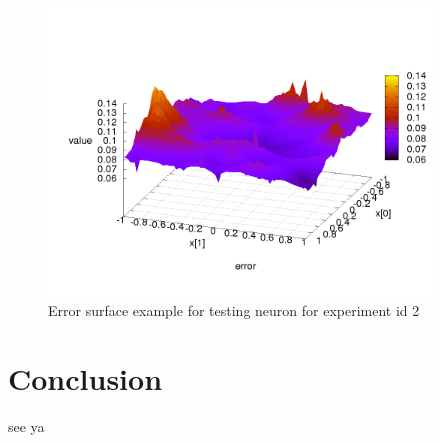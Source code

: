 \documentclass[times]{cpeauth}
\begin{document}
\begin{figure}[!ht]
\centering
\includegraphics[width=4.0in]{images/testing_neuron_1_layer_result_log_output_error.png}
\caption{Error surface example for testing neuron for experiment id 2}
\label{img:NN error example 01}
\end{figure}

\newpage
\section{Conclusion}

see ya
\end{document}
